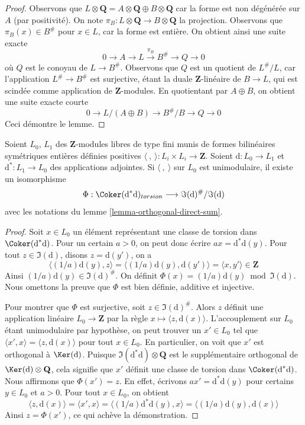 \begin{proof}
Observons que
$L \otimes \mathbf{Q} = A \otimes \mathbf{Q} \oplus B \otimes \mathbf{Q}$
car la forme est non dégénérée sur $A$ (par positivité).
On note $\pi_B : L \otimes \mathbf{Q} \to B \otimes \mathbf{Q}$
la projection. Observons que $\pi_B(x) \in B^\#$ pour $x \in L$,
car la forme est entière. On obtient ainsi une suite exacte
$$
0 \to A \to L \xrightarrow{\pi_B} B^\# \to Q \to 0
$$
où $Q$ est le conoyau de $L \to B^\#$. Observons que $Q$
est un quotient de $L^\#/L$, car l'application $L^\# \to B^\#$ est surjective,
étant la duale $\mathbf{Z}$-linéaire de $B \to L$, qui est scindée
comme application de $\mathbf{Z}$-modules.
En quotientant par $A \oplus B$, on obtient une suite exacte courte
$$
0 \to L/(A \oplus B) \to B^\#/B \to Q \to 0
$$
Ceci démontre le lemme.
\end{proof}

\begin{lemma}
\label{lemma-coker}
Soient $L_0$, $L_1$ des $\mathbf{Z}$-modules libres de type fini munis
de formes bilinéaires symétriques entières définies positives
$\langle\ ,\ \rangle : L_i \times L_i \to \mathbf{Z}$.
Soient $\text{d} : L_0 \to L_1$ et $\text{d}^* : L_1 \to L_0$
des applications adjointes. Si $\langle\ ,\ \rangle$ sur $L_0$ est unimodulaire,
il existe un isomorphisme
$$
\Phi :
\Coker(\text{d}^*\text{d})_{torsion}
\longrightarrow
\Im(\text{d})^\#/\Im(\text{d})
$$
avec les notations du lemme \ref{lemma-orthogonal-direct-sum}.
\end{lemma}

\begin{proof}
Soit $x \in L_0$ un élément représentant une classe de torsion
dans $\Coker(\text{d}^*\text{d})$.
Pour un certain $a > 0$, on peut donc écrire $ax = \text{d}^*\text{d}(y)$.
Pour tout $z \in \Im(\text{d})$, disons $z = \text{d}(y')$, on a
$$
\langle (1/a)\text{d}(y), z \rangle =
\langle (1/a)\text{d}(y), \text{d}(y') \rangle =
\langle x, y' \rangle \in \mathbf{Z}
$$
Ainsi $(1/a)\text{d}(y) \in \Im(\text{d})^\#$. On définit
$\Phi(x) = (1/a)\text{d}(y) \bmod \Im(\text{d})$.
Nous omettons la preuve que $\Phi$ est bien définie, additive et injective.

\medskip\noindent
Pour montrer que $\Phi$ est surjective, soit $z \in \Im(\text{d})^\#$.
Alors $z$ définit une application linéaire $L_0 \to \mathbf{Z}$
par la règle $x \mapsto \langle z, \text{d}(x)\rangle$.
L'accouplement sur $L_0$ étant unimodulaire par hypothèse,
on peut trouver un $x' \in L_0$ tel que
$\langle x', x \rangle = \langle z, \text{d}(x)\rangle$
pour tout $x \in L_0$. En particulier, on voit
que $x'$ est orthogonal à $\Ker(\text{d})$.
Puisque $\Im(\text{d}^*\text{d}) \otimes \mathbf{Q}$
est le supplémentaire orthogonal de $\Ker(\text{d}) \otimes \mathbf{Q}$,
cela signifie que $x'$ définit une classe de torsion dans
$\Coker(\text{d}^*\text{d})$. Nous affirmons que $\Phi(x') = z$.
En effet, écrivons $a x' = \text{d}^*\text{d}(y)$
pour certains $y \in L_0$ et $a > 0$.
Pour tout $x \in L_0$, on obtient
$$
\langle z, \text{d}(x)\rangle =
\langle x', x \rangle =
\langle (1/a)\text{d}^*\text{d}(y), x \rangle =
\langle (1/a)\text{d}(y),\text{d}(x) \rangle
$$
Ainsi $z = \Phi(x')$, ce qui achève la démonstration.
\end{proof}

